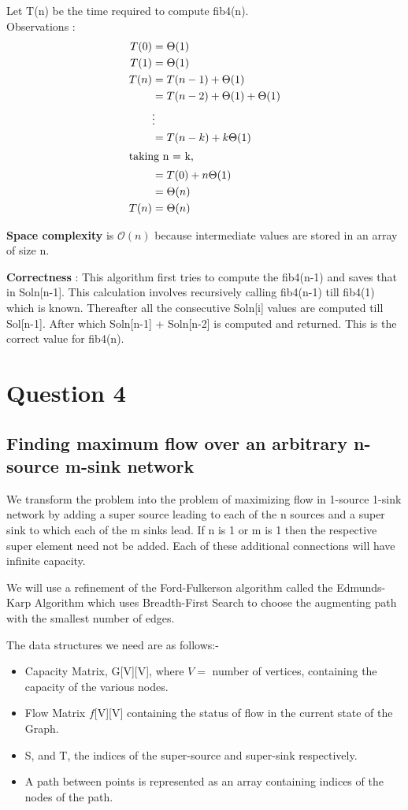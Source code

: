 \documentclass{article}
\begin{document}
Let T(n) be the time required to compute fib4(n). \\
Observations : \\
\begin{align*}
T(0) & = \Theta(1) \\
T(1) & = \Theta(1) \\
T(n) & = T(n-1) + \Theta(1) \\
& = T(n-2) + \Theta(1) + \Theta(1) \\
& \vdots \\
& = T(n-k) + k\Theta(1) \\
\intertext{taking n = k,}
& = T(0) + n\Theta(1) \\
& = \Theta(n) \\
T(n) & = \Theta(n)\\
\end{align*}

\textbf{Space complexity} is $\mathcal{O}(n)$ because intermediate values are stored in an array of size n.

\textbf{Correctness} : This algorithm first tries to compute the fib4(n-1) and saves that in Soln[n-1]. This calculation involves recursively calling fib4(n-1) till fib4(1) which is known. Thereafter all the consecutive Soln[i] values are computed till Sol[n-1]. After which Soln[n-1] + Soln[n-2] is computed and returned. This is the correct value for fib4(n).

\newpage
\section{Question 4}
\subsection{Finding maximum flow over an arbitrary n-source m-sink network}
We transform the problem into the problem of maximizing flow in 1-source 1-sink  network by adding a super source leading to each of the n sources and a super sink to which each of the m sinks lead. If n is 1 or m is 1 then the respective super element need not be added. Each of these additional connections will have infinite capacity.

We will use a refinement of the Ford-Fulkerson algorithm called the Edmunds-Karp Algorithm which uses Breadth-First Search to choose the augmenting path with the smallest number of edges.

The data structures we need are as follows:-
\begin{itemize}
\item Capacity Matrix, G[V][V], where $V = $ number of vertices, containing the capacity of the various nodes.
\item Flow Matrix $f$[V][V] containing the status of flow in the current state of the Graph.
\item S, and T, the indices of the super-source and super-sink respectively.
\item A path between points is represented as an array containing indices of the nodes of the path. 
\end{itemize}
\end{document}
